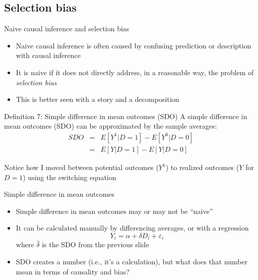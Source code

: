 \documentclass{beamer}
\begin{document}
\subsection{Selection bias}

\begin{frame}{Naive causal inference and selection bias}

  \begin{itemize}
    \item Naive causal inference is often caused by confusing prediction or description with causal inference
    \item It is naive if it does not directly address, in a reasonable way, the problem of \emph{selection bias}
    \item This is better seen with a story and a decomposition
  \end{itemize}

\end{frame}






\begin{frame}[plain]


  \begin{block}{Definition 7: Simple difference in mean outcomes (SDO)}
    A simple difference in mean outcomes (SDO) can be approximated by the sample averages:\begin{eqnarray*}
      SDO &=& E[Y^1 | D=1] - E[Y^0 | D=0] \\
      &=& E[Y | D=1] - E[Y | D=0]
    \end{eqnarray*}
  \end{block}
  \bigskip

Notice how I moved between potential outcomes ($Y^1$) to realized outcomes ($Y$ for $D=1$) using the switching equation

\end{frame}

\begin{frame}{Simple difference in mean outcomes}

  \begin{itemize}
    \item Simple difference in mean outcomes may or may not be ``naive''
    \item It can be calculated manually by differencing averages, or with a regression $$Y_i = \alpha + \delta D_i + \varepsilon_{i}$$where $\widehat{\delta}$ is the SDO from the previous slide
    \item SDO creates a number (i.e., it's a calculation), but what does that number mean in terms of causality and bias?
  \end{itemize}

\end{frame}
\end{document}
